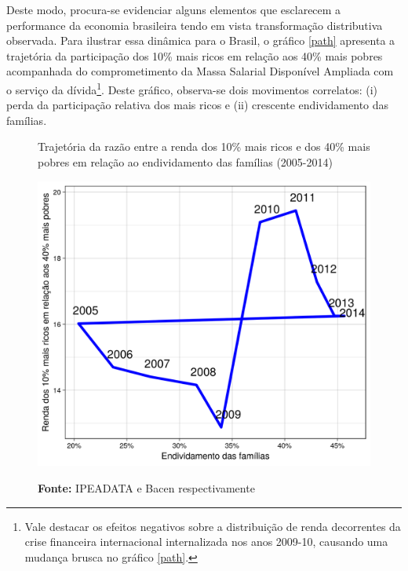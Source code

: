 Deste modo, procura-se evidenciar alguns elementos que esclarecem a performance da economia brasileira tendo em vista transformação distributiva observada. Para ilustrar essa dinâmica para o Brasil, o gráfico \ref{path} apresenta a trajetória da participação dos 10\% mais ricos em relação aos 40\% mais pobres acompanhada do comprometimento da Massa Salarial Disponível Ampliada com o serviço da dívida\footnote{Vale destacar os efeitos negativos sobre a distribuição de renda decorrentes da crise financeira internacional internalizada nos anos 2009-10, causando uma mudança brusca no gráfico \ref{path}.}. Deste gráfico, observa-se dois movimentos correlatos: (i) perda da participação relativa dos mais ricos e (ii) crescente endividamento das famílias.


\begin{figure}[htb]
\centering
\caption{Trajetória da razão entre a renda dos 10\% mais ricos e dos 40\% mais pobres em relação ao endividamento das famílias (2005-2014)}
\label{path}
\includegraphics[width= .6\textwidth]{2018-07-23_Path_Endiv_10p40.png}\label{Razao}
\caption*{\textbf{Fonte:} IPEADATA e Bacen respectivamente}
\end{figure}

